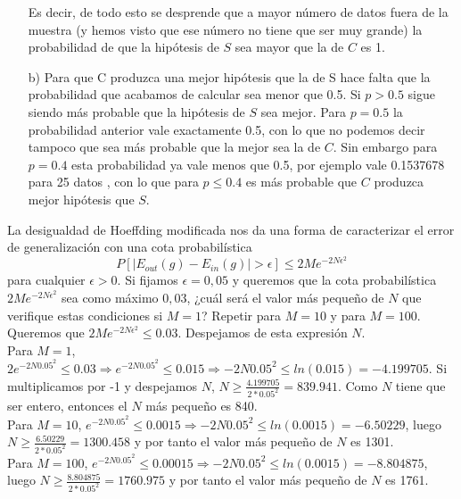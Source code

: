 \documentclass[12pt]{article}
\theoremstyle{definition}
\begin{document}
\begin{pregunta}
\begin{enumerate}
Es decir, de todo esto se desprende que a mayor número de datos fuera de la muestra (y hemos visto que ese número no tiene que ser muy grande) la probabilidad de que la hipótesis de $S$ sea mayor que la de $C$ es 1.
\item[b)] Para que C produzca una mejor hipótesis que la de S hace falta que la probabilidad que acabamos de calcular sea menor que 0.5. Si $p>0.5$ sigue siendo más probable que la hipótesis de $S$ sea mejor. Para $p=0.5$ la probabilidad anterior vale exactamente 0.5, con lo que no podemos decir tampoco que sea más probable que la mejor sea la de $C$. Sin embargo para $p=0.4$ esta probabilidad ya vale menos que 0.5, por ejemplo vale 0.1537678 para 25 datos , con lo que para $p\leq0.4$ es más probable que $C$ produzca mejor hipótesis que $S$.

\end{enumerate}
\end{pregunta}

\begin{pregunta}
La desigualdad de Hoeffding modificada nos da una forma de caracterizar el error de generalización con una cota probabilística
\begin{equation}
P[|E_{out}(g) - E_{in}(g)| > \epsilon] \leqslant 2Me^{-2N \epsilon^2}
\end{equation}
para cualquier $\epsilon > 0$. Si fijamos $\epsilon=0,05$ y queremos que la cota probabilística $2Me^{-2N \epsilon^2}$ sea como máximo $0,03$, ¿cuál será el valor más pequeño de $N$ que verifique estas condiciones si $M=1$? Repetir para $M=10$ y para $M=100$.\\

Queremos que $2Me^{-2N \epsilon^2} \leq 0.03$. Despejamos de esta expresión $N$.\\

Para $M=1$, $2e^{-2N0.05^2} \leq 0.03 \Rightarrow e^{-2N0.05^2} \leq 0.015 \Rightarrow -2N0.05^2 \leq ln(0.015) = -4.199705$. Si multiplicamos por -1 y despejamos $N$, $N \geq \frac{4.199705}{2*0.05^2} = 839.941$. Como $N$ tiene que ser entero, entonces el $N$ más pequeño es 840.\\

Para $M=10$, $e^{-2N0.05^2} \leq 0.0015 \Rightarrow -2N0.05^2 \leq ln(0.0015) = -6.50229$, luego $N \geq \frac{6.50229}{2*0.05^2} = 1300.458$ y por tanto el valor más pequeño de $N$ es 1301.\\

Para $M=100$, $e^{-2N0.05^2} \leq 0.00015 \Rightarrow -2N0.05^2 \leq ln(0.0015) = -8.804875$, luego $N \geq \frac{8.804875}{2*0.05^2} = 1760.975$ y por tanto el valor más pequeño de $N$ es 1761.
\end{pregunta}
\end{document}
